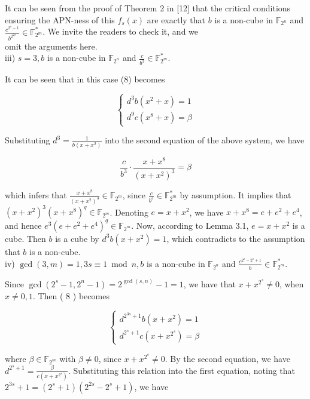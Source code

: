 \documentclass[10pt]{article}
\begin{document}
It can be seen from the proof of Theorem 2 in [12] that the critical conditions ensuring the APN-ness of this $f_{s}(x)$ are exactly that $b$ is a non-cube in $\mathbb{F}_{2^{n}}$ and $\frac{c^{2^{s}-1}}{b^{2^{2 s}}} \in \mathbb{F}_{2^{m}}^{*}$. We invite the readers to check it, and we\\
omit the arguments here.\\
iii) $s=3, b$ is a non-cube in $\mathbb{F}_{2^{n}}$ and $\frac{c}{b^{3}} \in \mathbb{F}_{2^{m}}^{*}$.

It can be seen that in this case (8) becomes

$$
\left\{\begin{array}{l}
d^{3} b\left(x^{2}+x\right)=1 \\
d^{9} c\left(x^{8}+x\right)=\beta
\end{array}\right.
$$

Substituting $d^{3}=\frac{1}{b\left(x+x^{2}\right)}$ into the second equation of the above system, we have

$$
\frac{c}{b^{3}} \cdot \frac{x+x^{8}}{\left(x+x^{2}\right)^{3}}=\beta
$$

which infers that $\frac{x+x^{8}}{\left(x+x^{2}\right)^{3}} \in \mathbb{F}_{2^{m}}$, since $\frac{c}{b^{3}} \in \mathbb{F}_{2^{m}}^{*}$ by assumption. It implies that $\left(x+x^{2}\right)^{3}\left(x+x^{8}\right)^{q} \in \mathbb{F}_{2^{m}}$. Denoting $e=x+x^{2}$, we have $x+x^{8}=e+e^{2}+e^{4}$, and hence $e^{3}\left(e+e^{2}+e^{4}\right)^{q} \in \mathbb{F}_{2^{m}}$. Now, according to Lemma 3.1, $e=x+x^{2}$ is a cube. Then $b$ is a cube by $d^{3} b\left(x+x^{2}\right)=1$, which contradicts to the assumption that $b$ is a non-cube.\\
iv) $\operatorname{gcd}(3, m)=1,3 s \equiv 1 \bmod n, b$ is a non-cube in $\mathbb{F}_{2^{n}}$ and $\frac{c^{2^{s}-2^{s}+1}}{b} \in \mathbb{F}_{2^{m}}^{*}$.

Since $\operatorname{gcd}\left(2^{s}-1,2^{n}-1\right)=2^{\operatorname{gcd}(s, n)}-1=1$, we have that $x+x^{2^{s}} \neq 0$, when $x \neq 0,1$. Then ( 8 ) becomes

$$
\left\{\begin{array}{l}
d^{2^{3 s}+1} b\left(x+x^{2}\right)=1 \\
d^{2^{s}+1} c\left(x+x^{2^{s}}\right)=\beta
\end{array}\right.
$$

where $\beta \in \mathbb{F}_{2^{m}}$ with $\beta \neq 0$, since $x+x^{2^{s}} \neq 0$. By the second equation, we have $d^{2^{s}+1}=\frac{\beta}{c\left(x+x^{2^{s}}\right)}$. Substituting this relation into the first equation, noting that $2^{3 s}+1=\left(2^{s}+1\right)\left(2^{2 s}-2^{s}+1\right)$, we have
\end{document}
